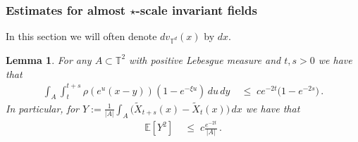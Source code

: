 \documentclass[11pt]{article}
\numberwithin{equation}{section}
\newtheorem{lemma}[theorem]{Lemma}
\theoremstyle{definition}
\renewcommand{\tilde}{\widetilde}          %
\renewcommand{\leq}{\;\leqslant\;}                   %
\newcommand{\E}{\mathbb{E}}
\def\T{\mathbb{T}}
\newcommand{\grea}{>}
\begin{document}
\subsubsection{Estimates for almost $\star$-scale invariant fields}

In this section we will often denote $dv_{\T^d}(x)$ by $dx$.

\begin{lemma}\label{y_lemma}
For any $A \subset \T^2$ with positive Lebesgue measure and $t,s \grea 0$ we have that 
\begin{align*}
\int_{A} \int_t^{t+s} \rho(e^u (x-y))(1-e^{-\xi u}) \, du \,  dy  &\leq c  e^{-2t} \big( 1 - e^{-2s} \big) \,.
\end{align*}
In particular, for $Y := \frac{1}{|A|} \int_A \big( \tilde X_{t+s}(x) - \tilde X_t(x) \big) \, dx$ we have that 
\begin{align*}
\E[Y^2] & \leq c \frac{e^{-2t}}{|A|}\,.
\end{align*}
\end{lemma}
\end{document}
